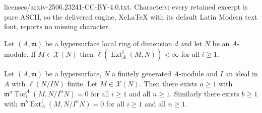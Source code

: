 \documentclass[10pt,a4paper]{amsart}
\newcommand{\Ext}{\operatorname{Ext}}
\newcommand{\Tor}{\operatorname{Tor}}
\newcommand{\X}{\mathcal{X} }
\newcommand{\m}{\mathfrak{m} }
\begin{document}
licenses/arxiv-2506.23241-CC-BY-4.0.txt. Characters: every retained excerpt is pure ASCII, so the delivered engine, XeLaTeX with its default Latin Modern text font, reports no missing character.
\begin{proposition}\label{ext-x}
Let $(A, \m)$ be a hypersurface local ring of dimension $d$  and let $N$ be an $A$-module.
If $M \in \X(N)$ then $\ell(\Ext^i_A(M, N)) < \infty $ for all $i \geq 1$.
\end{proposition}

\begin{lemma}\label{ann}
Let $(A,\m)$ be a hypersurface, $N$ a finitely generated $A$-module and $I$ an ideal in $A$ with $\ell(N/IN)$ finite. Let $M \in \X(N)$. Then there exists $a \geq 1$ with
$\m^a\Tor^A_i(M, N/I^{n}N) = 0$ for all $i \geq 1$ and all $n \geq 1$. Similarly there exists $b \geq 1$ with
$\m^b\Ext^i_A(M, N/I^{n}N) = 0$ for all $i \geq 1$ and all $n \geq 1$.
\end{lemma}
\end{document}
